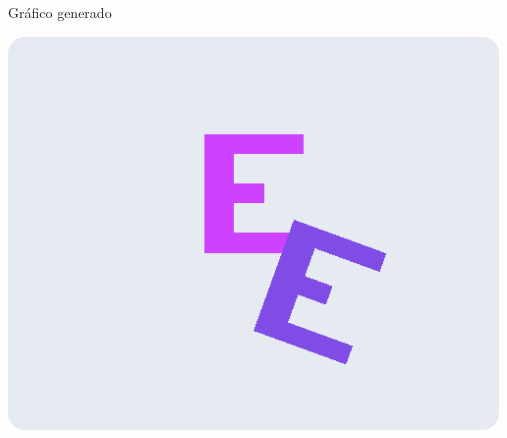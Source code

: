 \documentclass[a4paper]{article}
\begin{document}
Gráfico generado\\
\begin{center}
\includegraphics[width=13cm]{src/2.png}
\end{center}
\newpage
\end{document}

